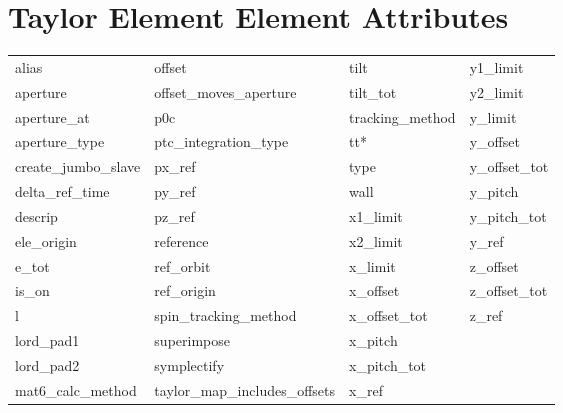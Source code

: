  \vfill
 
 \section{Taylor Element Element Attributes}
 \label{s:list.taylor}
 
 \begin{tabular}{llll} \toprule
alias                       & offset                      & tilt                        & y1_limit                    \\
aperture                    & offset_moves_aperture       & tilt_tot                    & y2_limit                    \\
aperture_at                 & p0c                         & tracking_method             & y_limit                     \\
aperture_type               & ptc_integration_type        & tt*                         & y_offset                    \\
create_jumbo_slave          & px_ref                      & type                        & y_offset_tot                \\
delta_ref_time              & py_ref                      & wall                        & y_pitch                     \\
descrip                     & pz_ref                      & x1_limit                    & y_pitch_tot                 \\
ele_origin                  & reference                   & x2_limit                    & y_ref                       \\
e_tot                       & ref_orbit                   & x_limit                     & z_offset                    \\
is_on                       & ref_origin                  & x_offset                    & z_offset_tot                \\
l                           & spin_tracking_method        & x_offset_tot                & z_ref                       \\
lord_pad1                   & superimpose                 & x_pitch                     &                             \\
lord_pad2                   & symplectify                 & x_pitch_tot                 &                             \\
mat6_calc_method            & taylor_map_includes_offsets & x_ref                       &                             \\
 \bottomrule
 \end{tabular}
 \vfill
 
